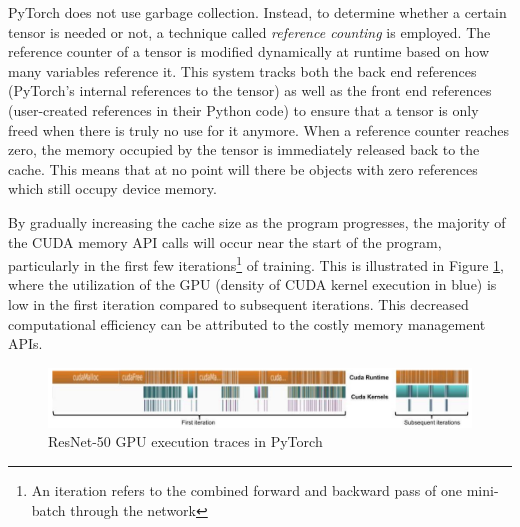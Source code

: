\documentclass[12pt,letterpaper]{article}
\begin{document}
PyTorch does not use garbage collection. Instead, to determine whether a certain tensor is needed or not, a technique called \textit{reference counting} is employed. The reference counter of a tensor is modified dynamically at runtime based on how many variables reference it. This system tracks both the back end references (PyTorch's internal references to the tensor) as well as the front end references (user-created references in their Python code) to ensure that a tensor is only freed when there is truly no use for it anymore. When a reference counter reaches zero, the memory occupied by the tensor is immediately released back to the cache. This means that at no point will there be objects with zero references which still occupy device memory.\par 

By gradually increasing the cache size as the program progresses, the majority of the CUDA memory API calls will occur near the start of the program, particularly in the first few iterations\footnote{An iteration refers to the combined forward and backward pass of one mini-batch through the network} of training. This is illustrated in Figure \ref{fig:cuda_memory_kernels}, where the utilization of the GPU (density of CUDA kernel execution in blue) is low in the first iteration compared to subsequent iterations. This decreased computational efficiency can be attributed to the costly memory management APIs.
\begin{figure}[ht]
\centering
\includegraphics[width=.9\textwidth]{cuda_kernel_caching.png}
\captionsetup{width=0.7\linewidth}
\caption{ResNet-50 GPU execution traces in PyTorch \cite{pytorch_paper}}
\label{fig:cuda_memory_kernels}
\end{figure}

 
%
%
\end{document}
